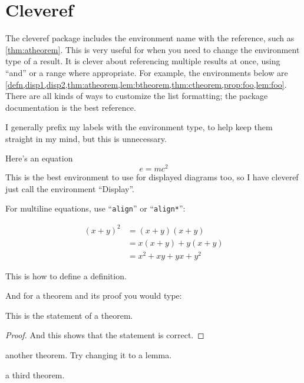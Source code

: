 \documentclass[11pt,oneside,draft]{amsart}
\begin{document}
\section{Cleveref}\label{sec:cleveref}

The cleveref package includes the environment name with the reference,
such as \cref{thm:atheorem}.  This is very useful for when you need to
change the environment type of a result.  It is clever about
referencing multiple results at once, using ``and'' or a range where
appropriate.  For example, the environments below are 
\cref{defn,disp1,disp2,thm:atheorem,lem:btheorem,thm:ctheorem,prop:foo,lem:foo}.
There are all kinds of ways to customize the list formatting; the
package documentation is the best reference.

I generally prefix my labels with the environment type, to help keep
them straight in my mind, but this is unnecessary.

Here's an equation
\begin{equation}\label{disp1}
  e = mc^2
\end{equation}
This is the best environment to use for displayed diagrams too, so I
have cleveref just call the environment ``Display''.

For multiline equations, use ``\texttt{align}'' or
``\texttt{align*}'':

\begin{align}\label{disp2}
  (x + y)^2 & = (x+y) (x+y) \\
  & = x(x+y) + y(x+y) \nonumber\\
  & = x^2 + xy + yx + y^2 
\end{align}


\begin{defn}\label{defn}
  This is how to define a definition.
\end{defn}

And for a theorem and its proof you would type:

\begin{thm}\label{thm:atheorem}
This is the statement of a theorem.
\end{thm}
\begin{proof}
And this shows that the statement is correct.
\end{proof}

\begin{thm}\label{lem:btheorem}
  another theorem.  Try changing it to a lemma.
\end{thm}

\begin{thm}\label{thm:ctheorem}
  a third theorem.
\end{thm}
\end{document}
